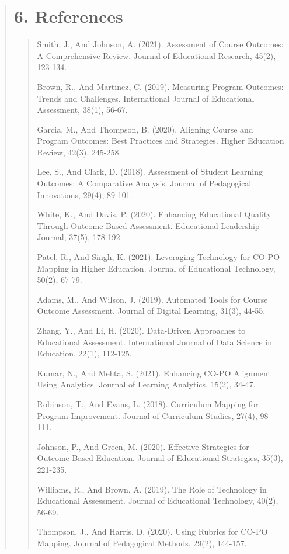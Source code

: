 \documentclass[12pt]{report}
\begin{document}
	\begin{quote}
		\section{ 6. References}
		\begin{quote}
			Smith, J., And Johnson, A. (2021). Assessment of Course Outcomes: A Comprehensive Review. Journal of Educational Research, 45(2), 123-134.
			
			Brown, R., And Martinez, C. (2019). Measuring Program Outcomes: Trends and Challenges. International Journal of Educational Assessment, 38(1), 56-67.
			
			Garcia, M., And Thompson, B. (2020). Aligning Course and Program Outcomes: Best Practices and Strategies. Higher Education Review, 42(3), 245-258.
			
			Lee, S., And Clark, D. (2018). Assessment of Student Learning Outcomes: A Comparative Analysis. Journal of Pedagogical Innovations, 29(4), 89-101.
			
			White, K., And Davis, P. (2020). Enhancing Educational Quality Through Outcome-Based Assessment. Educational Leadership Journal, 37(5), 178-192.
			
			Patel, R., And Singh, K. (2021). Leveraging Technology for CO-PO Mapping in Higher Education. Journal of Educational Technology, 50(2), 67-79.
			
			Adams, M., And Wilson, J. (2019). Automated Tools for Course Outcome Assessment. Journal of Digital Learning, 31(3), 44-55.
			
			Zhang, Y., And Li, H. (2020). Data-Driven Approaches to Educational Assessment. International Journal of Data Science in Education, 22(1), 112-125.
			
			Kumar, N., And Mehta, S. (2021). Enhancing CO-PO Alignment Using Analytics. Journal of Learning Analytics, 15(2), 34-47.
			
			Robinson, T., And Evans, L. (2018). Curriculum Mapping for Program Improvement. Journal of Curriculum Studies, 27(4), 98-111.
			\clearpage
			
			Johnson, P., And Green, M. (2020). Effective Strategies for Outcome-Based Education. Journal of Educational Strategies, 35(3), 221-235.
			
			Williams, R., And Brown, A. (2019). The Role of Technology in Educational Assessment. Journal of Educational Technology, 40(2), 56-69.
			
			Thompson, J., And Harris, D. (2020). Using Rubrics for CO-PO Mapping. Journal of Pedagogical Methods, 29(2), 144-157.
			

\end{quote}
\end{quote}
\end{document}
